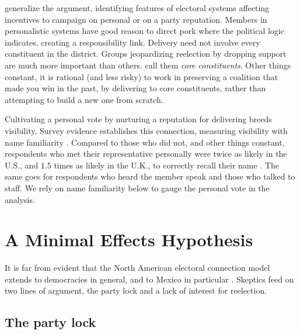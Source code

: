 \documentclass[letter,12pt]{article}
\begin{document}
\citet{carey.shugart.1995} generalize the argument, identifying features of electoral systems affecting incentives to campaign on personal or on a party reputation. Members in personalistic systems have good reason to direct pork where the political logic indicates, creating a responsibility link. Delivery need not involve every constituent in the district. Groups jeopardizing reelection by dropping support are much more important than others. \citet{cox.mccubbins.1986} call them \emph{core constituents}. Other things constant, it is rational (and less risky) to work in preserving a coalition that made you win in the past, by delivering to core constituents, rather than attempting to build a new one from scratch.

Cultivating a personal vote by nurturing a reputation for delivering breeds visibility. Survey evidence establishes this connection, measuring visibility with name familiarity \citep{abramowitz1975name-familiarity}. Compared to those who did not, and other things constant, respondents who met their representative personally were twice as likely in the U.S., and 1.5 times as likely in the U.K., to correctly recall their name \citep[][:34]{cain.etal.1987}. The same goes for respondents who heard the member speak and those who talked to staff. We rely on name familiarity below to gauge the personal vote in the analysis. 


\section{A Minimal Effects Hypothesis}

It is far from evident that the North American electoral connection model extends to democracies in general, and to Mexico in particular \citep{samuels.2003,jones.etal.amateurLegis.2002}. Skeptics feed on two lines of argument, the party lock and a lack of interest for reelection.

\subsection{The party lock}
\end{document}
